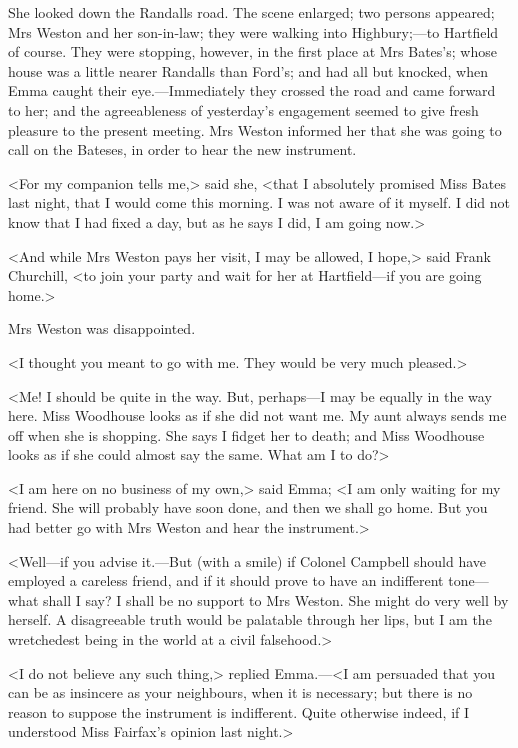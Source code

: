 She looked down the Randalls road. The scene enlarged; two persons appeared; Mrs Weston and her son-in-law; they were walking into Highbury;—to Hartfield of course. They were stopping, however, in the first place at Mrs Bates's; whose house was a little nearer Randalls than Ford's; and had all but knocked, when Emma caught their eye.—Immediately they crossed the road and came forward to her; and the agreeableness of yesterday's engagement seemed to give fresh pleasure to the present meeting. Mrs Weston informed her that she was going to call on the Bateses, in order to hear the new instrument.

<For my companion tells me,> said she, <that I absolutely promised Miss Bates last night, that I would come this morning. I was not aware of it myself. I did not know that I had fixed a day, but as he says I did, I am going now.>

<And while Mrs Weston pays her visit, I may be allowed, I hope,> said Frank Churchill, <to join your party and wait for her at Hartfield—if you are going home.>

Mrs Weston was disappointed.

<I thought you meant to go with me. They would be very much pleased.>

<Me! I should be quite in the way. But, perhaps—I may be equally in the way here. Miss Woodhouse looks as if she did not want me. My aunt always sends me off when she is shopping. She says I fidget her to death; and Miss Woodhouse looks as if she could almost say the same. What am I to do?>

<I am here on no business of my own,> said Emma; <I am only waiting for my friend. She will probably have soon done, and then we shall go home. But you had better go with Mrs Weston and hear the instrument.>

<Well—if you advise it.—But (with a smile) if Colonel Campbell should have employed a careless friend, and if it should prove to have an indifferent tone—what shall I say? I shall be no support to Mrs Weston. She might do very well by herself. A disagreeable truth would be palatable through her lips, but I am the wretchedest being in the world at a civil falsehood.>

<I do not believe any such thing,> replied Emma.—<I am persuaded that you can be as insincere as your neighbours, when it is necessary; but there is no reason to suppose the instrument is indifferent. Quite otherwise indeed, if I understood Miss Fairfax's opinion last night.>

